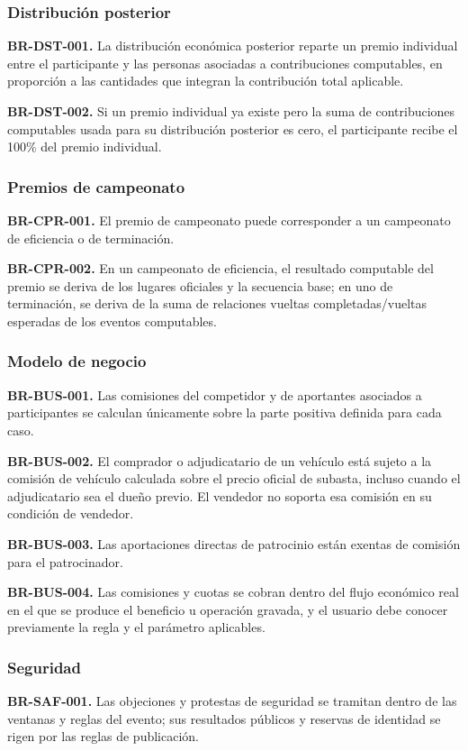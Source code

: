 \documentclass[10pt,letterpaper]{article}
\begin{document}
\subsubsection{Distribución posterior}
\noindent\textbf{BR-DST-001.} La distribución económica posterior reparte un premio individual entre el participante y las personas asociadas a contribuciones computables, en proporción a las cantidades que integran la contribución total aplicable.\par
\noindent\textbf{BR-DST-002.} Si un premio individual ya existe pero la suma de contribuciones computables usada para su distribución posterior es cero, el participante recibe el 100\% del premio individual.\par
\subsubsection{Premios de campeonato}
\noindent\textbf{BR-CPR-001.} El premio de campeonato puede corresponder a un campeonato de eficiencia o de terminación.\par
\noindent\textbf{BR-CPR-002.} En un campeonato de eficiencia, el resultado computable del premio se deriva de los lugares oficiales y la secuencia base; en uno de terminación, se deriva de la suma de relaciones vueltas completadas/vueltas esperadas de los eventos computables.\par
\subsubsection{Modelo de negocio}
\noindent\textbf{BR-BUS-001.} Las comisiones del competidor y de aportantes asociados a participantes se calculan únicamente sobre la parte positiva definida para cada caso.\par
\noindent\textbf{BR-BUS-002.} El comprador o adjudicatario de un vehículo está sujeto a la comisión de vehículo calculada sobre el precio oficial de subasta, incluso cuando el adjudicatario sea el dueño previo. El vendedor no soporta esa comisión en su condición de vendedor.\par
\noindent\textbf{BR-BUS-003.} Las aportaciones directas de patrocinio están exentas de comisión para el patrocinador.\par
\noindent\textbf{BR-BUS-004.} Las comisiones y cuotas se cobran dentro del flujo económico real en el que se produce el beneficio u operación gravada, y el usuario debe conocer previamente la regla y el parámetro aplicables.\par
\subsubsection{Seguridad}
\noindent\textbf{BR-SAF-001.} Las objeciones y protestas de seguridad se tramitan dentro de las ventanas y reglas del evento; sus resultados públicos y reservas de identidad se rigen por las reglas de publicación.\par
\end{document}
